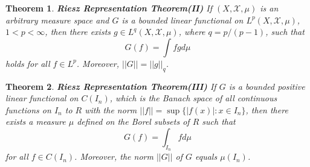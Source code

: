 \documentclass[12pt]{amsart}
\theoremstyle{plain}
\newtheorem{thm}{Theorem}[section]
\theoremstyle{definition}
\theoremstyle{remark}
\numberwithin{equation}{section}
\numberwithin{thm}{section}
\begin{document}
\begin{thm} 
\textbf{Riesz Representation Theorem(II)}
If $(X,\mathcal{X},\mu)$ is an arbitrary measure space and $G$ is a bounded linear functional on $L^p(X,\mathcal{X},\mu)$, $ 1 < p < \infty$, then there exists $g \in L^q(X,\mathcal{X},\mu)$, where $q=p/(p-1)$, such that  
\begin{equation*}
    G(f)=\int fg d\mu
\end{equation*}
holds for all $f \in L^p$. Moreover, $||G||=||g||_q$.
\end{thm}

\begin{thm} 
\textbf{Riesz Representation Theorem(III)}
If $G$ is a bounded positive linear functional on $C(I_n)$, which is the Banach space of all continuous functions on $I_n$ to $R$ with the norm $||f|| = \sup \{ |f(x)| : x \in I_n \}$, then there exists a measure $\mu$ defined on the Borel subsets of $R$ such that 
\begin{equation*}
    G(f)=\int_{I_n} f d\mu
\end{equation*}
for all $f \in C(I_n)$. Moreover, the norm $||G||$ of $G$ equals $\mu(I_n)$. 
\end{thm}
\end{document}
